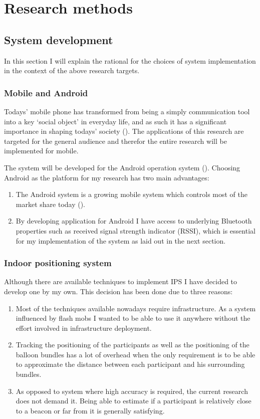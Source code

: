 \documentclass[a4paper,11pt]{article}
\begin{document}
\section{Research methods}

\subsection{System development}

In this section I will explain the rational for the choices of system implementation in the context of the above research targets.

\subsubsection{Mobile and Android}

Todays' mobile phone has transformed from being a simply communication tool into a key `social object' in everyday life, and as such it has a significant importance in shaping todays' society (\cite{srivastava05}).
The applications of this research are targeted for the general audience and therefor the entire research will be implemented for mobile.

The system will be developed for the Android operation system (\citeauthor{web:android}).
Choosing Android as the platform for my research has two main advantages:
\begin{enumerate}
	\item The Android system is a growing mobile system which controls most of the market share today (\cite{web:idc}).
	\item By developing application for Android I have access to underlying Bluetooth properties such as received signal strength indicator (RSSI), which is essential for my implementation of the system as laid out in the next section.
\end{enumerate}

\subsubsection{Indoor positioning system}\label{methods:ips}

Although there are available techniques to implement IPS I have decided to develop one by my own.
This decision has been done due to three reasons:
\begin{enumerate}
	\item Most of the techniques available nowadays require infrastructure.
	As a system influenced by flash mobs I wanted to be able to use it anywhere without the effort involved in infrastructure deployment.
	\item Tracking the positioning of the participants as well as the positioning of the balloon bundles has a lot of overhead when the only requirement is to be able to approximate the distance between each participant and his surrounding bundles.
	\item As opposed to system where high accuracy is required, the current research does not demand it.
	Being able to estimate if a participant is relatively close to a beacon or far from it is generally satisfying.
\end{enumerate}
\end{document}
